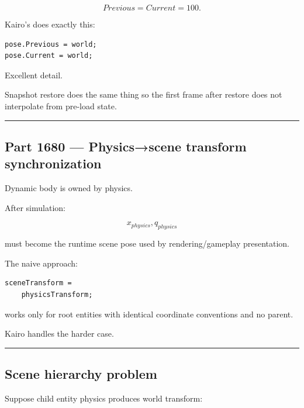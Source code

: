 \[
Previous=Current=100.
\]

Kairo's  does exactly this:

\begin{verbatim}
pose.Previous = world;
pose.Current = world;
\end{verbatim}

Excellent detail.

Snapshot restore does the same thing so the first frame after restore does not interpolate from pre-load state.

\begin{center}\rule{0.5\linewidth}{0.5pt}\end{center}

\subsection{Part 1680 --- Physics→scene transform synchronization}\label{06-engine-ii-ch037-part-1680-physicsscene-transform-synchronization}

\hypertarget{06-engine-ii-ch037-part-1680-physicsscene-transform-synchronization}{}

Dynamic body is owned by physics.

After simulation:

\[
x_{physics},q_{physics}
\]

must become the runtime scene pose used by rendering/gameplay presentation.

The naive approach:

\begin{verbatim}
sceneTransform =
    physicsTransform;
\end{verbatim}

works only for root entities with identical coordinate conventions and no parent.

Kairo handles the harder case.

\begin{center}\rule{0.5\linewidth}{0.5pt}\end{center}

\subsection{Scene hierarchy problem}\label{06-engine-ii-ch037-scene-hierarchy-problem}

\hypertarget{06-engine-ii-ch037-scene-hierarchy-problem}{}

Suppose child entity physics produces world transform:

